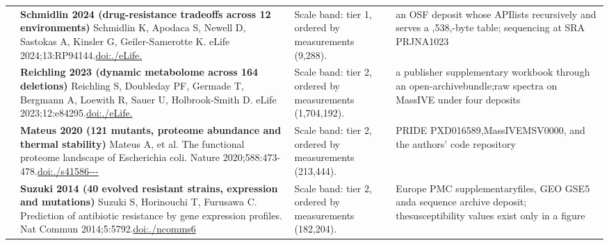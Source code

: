 \begin{landscape}
\begin{longtable}{@{}r@{\hspace{4pt}} L{78mm} L{72mm} L{76mm}@{}}
 & \textbf{Schmidlin 2024 (drug-resistance tradeoffs across 12 environments)} \newline Schmidlin K, Apodaca S, Newell D, Sastokas A, Kinsler G, Geiler-Samerotte K. eLife 2024;13:RP94144.\newline \href{https://doi.org/10.7554/eLife.94144}{doi:./\allowbreak eLife.} & Scale band: tier 1, ordered by measurements (9,288). & an OSF d\allowbreak eposit w\allowbreak hose API\allowbreak  lists r\allowbreak ecursive\allowbreak ly and s\allowbreak erves a ,538,-\allowbreak byte ta\allowbreak ble; seq\allowbreak uencing \allowbreak at SRA P\allowbreak RJNA1023 \\
 & \textbf{Reichling 2023 (dynamic metabolome across 164 deletions)} \newline Reichling S, Doubleday PF, Germade T, Bergmann A, Loewith R, Sauer U, Holbrook-Smith D. eLife 2023;12:e84295.\newline \href{https://doi.org/10.7554/eLife.84295}{doi:./\allowbreak eLife.} & Scale band: tier 2, ordered by measurements (1,704,192). & a publis\allowbreak her supp\allowbreak lementar\allowbreak y workbo\allowbreak ok throu\allowbreak gh an op\allowbreak en-\allowbreak archive\allowbreak  bundle;\allowbreak  raw spe\allowbreak ctra on \allowbreak MassIVE \allowbreak under fo\allowbreak ur depos\allowbreak its \\
 & \textbf{Mateus 2020 (121 mutants, proteome abundance and thermal stability)} \newline Mateus A, et al. The functional proteome landscape of Escherichia coli. Nature 2020;588:473-478.\newline \href{https://doi.org/10.1038/s41586-020-3002-5}{doi:./\allowbreak s41586---} & Scale band: tier 2, ordered by measurements (213,444). & PRIDE PX\allowbreak D016589,\allowbreak  MassIVE\allowbreak  MSV0000, a\allowbreak nd the a\allowbreak uthors' \allowbreak code rep\allowbreak ository \\
 & \textbf{Suzuki 2014 (40 evolved resistant strains, expression and mutations)} \newline Suzuki S, Horinouchi T, Furusawa C. Prediction of antibiotic resistance by gene expression profiles. Nat Commun 2014;5:5792.\newline \href{https://doi.org/10.1038/ncomms6792}{doi:./\allowbreak ncomms6} & Scale band: tier 2, ordered by measurements (182,204). & Europe P\allowbreak MC suppl\allowbreak ementary\allowbreak  files, \allowbreak GEO GSE5 and\allowbreak  a seque\allowbreak nce arch\allowbreak ive depo\allowbreak sit; the\allowbreak  suscept\allowbreak ibility \allowbreak values e\allowbreak xist onl\allowbreak y in a f\allowbreak igure \\

\end{longtable}
\end{landscape}
